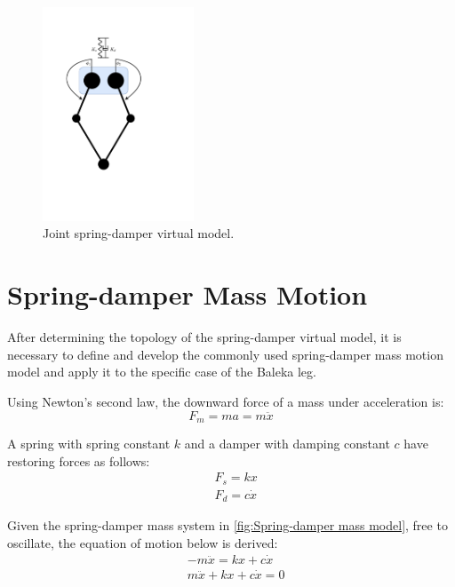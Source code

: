 \begin{figure}
\centering
\includegraphics[clip, trim=2cm 4cm 5cm 3cm, page = 1, width=0.4\textwidth]{images/geometry/joint-spring-damper} 
\caption{Joint spring-damper virtual model.}
\label{fig:Joint spring-damper virtual model}
\end{figure}

\section{Spring-damper Mass Motion}
\label{sec:Spring-damper Mass Motion}

After determining the topology of the spring-damper virtual model, it is necessary to define and develop the commonly used spring-damper mass motion model and apply it to the specific case of the Baleka leg.

Using Newton's second law, the downward force of a mass under acceleration is:
\begin{equation}
F_m = ma = m\ddot{x}
\end{equation}

A spring with spring constant $k$ and a damper with damping constant $c$ have restoring forces as follows:
\begin{equation}
\begin{aligned}
&F_s = kx \\
&F_d = c\dot{x}
\end{aligned}
\end{equation}

Given the spring-damper mass system in \cref{fig:Spring-damper mass model}, free to oscillate, the equation of motion below is derived: 
\begin{equation}
\begin{aligned}
&-m\ddot{x} = kx + c\dot{x}\\
&m\ddot{x} + kx + c\dot{x} = 0
\end{aligned}
\end{equation}

